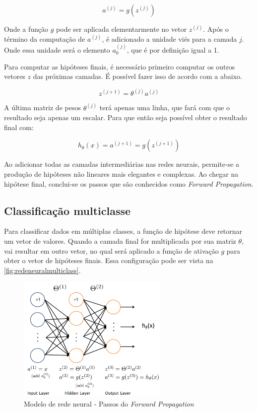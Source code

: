 \begin{equation} 
a^{(j)} = g(z^{(j)})  \nonumber
\end{equation}

Onde a função $g$ pode ser aplicada elementarmente no vetor $z^{(j)}$. Após o término da computação de $a^{(j)}$, é adicionado a unidade viés para a camada $j$. Onde essa unidade será o elemento $a_0^{(j)}$, que é por definição igual a 1.

Para computar as hipóteses finais, é necessário primeiro computar os outros vetores $z$ das próximas camadas. É possível fazer isso de acordo com a abaixo.

\begin{equation}
z^{(j+1)} =  \theta^{(j)}a^{(j)} \nonumber
\end{equation}

A última matriz de pesos $\theta^{(j)}$ terá apenas uma linha, que fará com que o resultado seja apenas um escalar. Para que então seja possível obter o resultado final com:

\begin{equation} 
h_{\theta}(x) = a^{(j+1)} = g(z^{(j+1)}) \nonumber
\end{equation}

Ao adicionar todas as camadas intermediárias nas redes neurais, permite-se a produção de hipóteses não lineares mais elegantes e complexas. Ao chegar na hipótese final, conclui-se os passos que são conhecidos como \textit{Forward Propagation}.


\subsection{Classificação multiclasse}\label{subsec:clasmultirn}

Para classificar dados em múltiplas classes, a função de hipótese deve retornar um vetor de valores. Quando a camada final for multiplicada por sua matriz $\theta$, vai resultar em outro vetor, no qual será aplicado a função de ativação $g$ para obter o vetor de hipóteses finais. Essa configuração pode ser vista na \autoref{fig:redeneuralmulticlass}.

\begin{figure}[!htb]
\centering
\caption{Modelo de rede neural - Passos do \textit{Forward Propagation}} \label{fig:redeneuralmulticlass}
\includegraphics[width=0.65\textwidth]{img/redeneuralmulticlass}
\end{figure}

